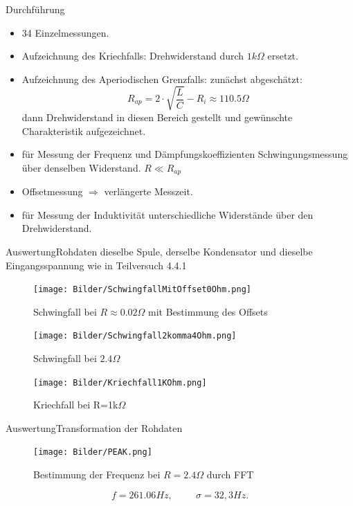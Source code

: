 \documentclass[11pt]{beamer}
\begin{document}
\begin{frame}{Durchführung}
\begin{itemize}
\item 34 Einzelmessungen.
\item Aufzeichnung des Kriechfalls: Drehwiderstand durch $1k\Omega$ ersetzt.
\item Aufzeichnung des Aperiodischen Grenzfalls: zunächst abgeschätzt:
\begin{equation}
R_{ap}=2\cdot\sqrt{\frac{L}{C}}-R_i\approx 110.5\Omega
\end{equation}
dann Drehwiderstand in diesen Bereich gestellt und gewünschte Charakteristik aufgezeichnet. 
\item für Messung der Frequenz und Dämpfungskoeffizienten Schwingungsmessung über denselben Widerstand. $R\ll R_{ap}$
\item Offsetmessung $\Rightarrow$ verlängerte Messzeit.
\item für Messung der Induktivität unterschiedliche Widerstände über den Drehwiderstand.
\end{itemize}
\end{frame}

\begin{frame}{Auswertung}{Rohdaten}
dieselbe Spule, derselbe Kondensator und dieselbe Eingangsspannung wie in Teilversuch 4.4.1
\begin{figure}[H]
\caption{Schwingfall bei $R\approx 0.02\Omega$ mit Bestimmung des Offsets}
\centering
\texttt{[image: Bilder/SchwingfallMitOffset0Ohm.png]}
\end{figure}
\end{frame}

\begin{frame}
\begin{figure}[H]
\caption{Schwingfall bei $2.4\Omega$}
\centering
\texttt{[image: Bilder/Schwingfall2komma4Ohm.png]}
\end{figure}
\end{frame}


\begin{frame}
\begin{figure}[H]
\caption{Kriechfall bei R=1k$\Omega$}
\centering
\texttt{[image: Bilder/Kriechfall1KOhm.png]}
\end{figure}
\end{frame}



\begin{frame}{Auswertung}{Transformation der Rohdaten}
\begin{figure}[H]
\caption{Bestimmung der Frequenz bei $R=2.4\Omega$ durch FFT}
\centering
\texttt{[image: Bilder/PEAK.png]}
\end{figure}
\begin{equation}
f=261.06 Hz, \hspace{1cm} \sigma=32,3 Hz.
\end{equation}
\end{frame}
\end{document}
